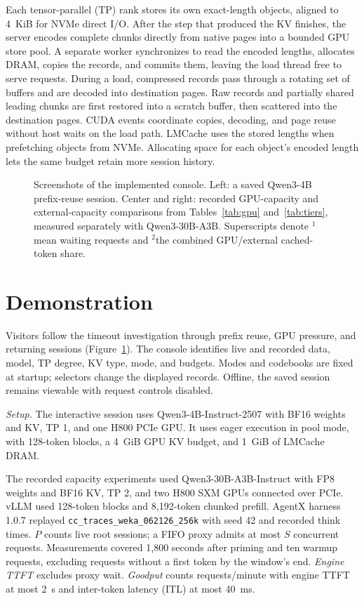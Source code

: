 \documentclass[conference]{IEEEtran}
\begin{document}
Each tensor-parallel (TP) rank stores its own exact-length objects, aligned
to 4~KiB for NVMe direct I/O. After the step that produced the KV finishes,
the server encodes complete chunks directly from native pages into a bounded
GPU store pool. A separate worker synchronizes to read the encoded lengths,
allocates DRAM, copies the records, and commits them, leaving the load
thread free to serve requests. During a load, compressed records pass through a rotating set of
buffers and are decoded into destination pages. Raw records and partially
shared leading chunks are first restored into a scratch buffer, then
scattered into the destination pages. CUDA events coordinate copies,
decoding, and page reuse without host waits on the load path. LMCache
uses the stored lengths when prefetching objects from NVMe. Allocating
space for each object's encoded length lets the same budget retain more
session history.

\begin{figure}[t]
\centering

\caption{Screenshots of the implemented console. Left: a saved Qwen3-4B
prefix-reuse session. Center and right: recorded GPU-capacity and
external-capacity comparisons from Tables~\ref{tab:gpu} and~\ref{tab:tiers},
measured separately with Qwen3-30B-A3B. Superscripts denote $^{1}$mean waiting
requests and $^{2}$the combined GPU/external cached-token share.}
\label{fig:views}
\end{figure}

\section{Demonstration}
\label{sec:demo}
Visitors follow the timeout investigation through prefix reuse, GPU
pressure, and returning sessions (Figure~\ref{fig:views}). The console
identifies live and recorded data, model, TP degree, KV type, mode, and
budgets. Modes and codebooks are fixed at startup; selectors change the
displayed records. Offline, the saved session remains viewable with request
controls disabled.

\emph{Setup.} The interactive session uses Qwen3-4B-Instruct-2507 with BF16
weights and KV, TP 1, and one H800 PCIe GPU. It uses eager execution in pool
mode, with 128-token blocks, a 4~GiB GPU KV budget, and 1~GiB of LMCache DRAM.

The recorded capacity experiments used Qwen3-30B-A3B-Instruct
with FP8 weights and BF16 KV, TP 2, and two H800 SXM GPUs connected over
PCIe. vLLM used 128-token blocks and 8,192-token chunked prefill.
AgentX harness 1.0.7 replayed \texttt{cc\_traces\_weka\_062126\_256k} with
seed 42 and recorded think times. $P$ counts live root sessions; a FIFO
proxy admits at most $S$ concurrent requests. Measurements covered
1,800 seconds after priming and ten warmup requests, excluding requests
without a first token by the window's end. \emph{Engine TTFT} excludes
proxy wait. \emph{Goodput} counts requests/minute with engine TTFT at most
2~s and inter-token latency (ITL) at most 40~ms.
\end{document}
